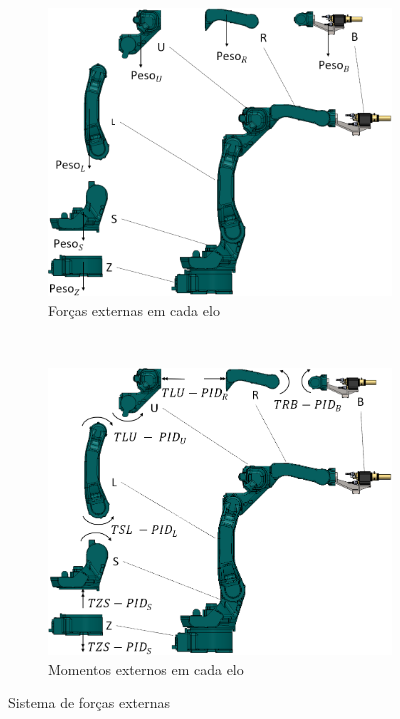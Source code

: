 \begin{figure}[h!]
    \centering
    \begin{subfigure}[b]{0.48\textwidth}
        \includegraphics[width=\textwidth]{figs/forcas_ext}
        \caption{Forças externas em cada elo}
        \label{fig::fex}
    \end{subfigure}
    ~ %
    \begin{subfigure}[b]{0.48\textwidth}
        \includegraphics[width=\textwidth]{figs/mom_ext}
        \caption{Momentos externos em cada elo}
        \label{fig::mex}
    \end{subfigure}
    \caption{Sistema de forças externas}\label{fig::sisfex}
\end{figure}

